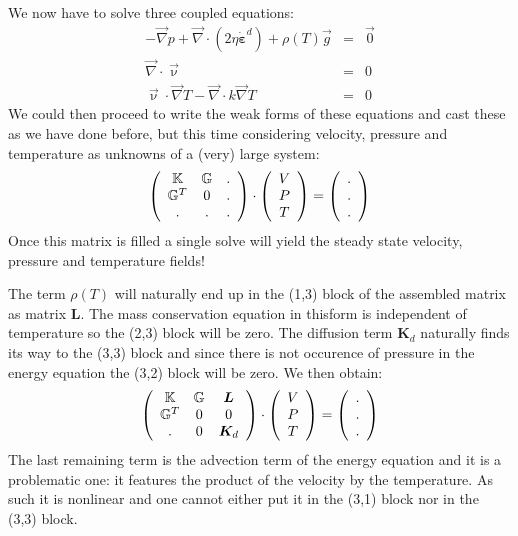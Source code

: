 We now have to solve three coupled equations:
\begin{eqnarray}
-{\vec \nabla}p + {\vec \nabla}\cdot (2 \eta \dot{\bm \varepsilon}^d ) + \rho(T) {\vec g} &=& \vec{0} \\
{\vec \nabla}\cdot{\vec \upnu} &=& 0 \\ 
\vec{\upnu}\cdot\vec\nabla T - {\vec \nabla} \cdot k {\vec \nabla} T &=& 0 
\end{eqnarray}
We could then proceed to write the weak forms of these equations and cast these as we have done before, 
but this time considering velocity, pressure and temperature as unknowns of a (very) large system:
\[
\left(
\begin{array}{ccc}
{\mathbb{K}} & {\mathbb{G}} & . \\
{\mathbb{G}}^T & 0 & . \\
. & . & . 
\end{array}
\right)
\cdot
\left(
\begin{array}{c}
V \\ P \\ T 
\end{array}
\right)
=
\left(
\begin{array}{c}
. \\ . \\ .
\end{array}
\right)
\]
Once this matrix is filled a single solve will yield the steady state velocity, pressure and 
temperature fields! 

The term $\rho(T)$ will naturally end up in the (1,3) block of the assembled matrix as matrix ${\bm L}$.
The mass conservation equation in thisform is independent of temperature so the (2,3) block 
will be zero. The diffusion term ${\bm K}_d$ naturally finds its way to the (3,3) 
block and since there is not occurence of pressure in the energy equation the (3,2) 
block will be zero. We then obtain:
\[
\left(
\begin{array}{ccc}
{\mathbb{K}} & {\mathbb{G}} & {\bm L} \\
{\mathbb{G}}^T & 0 & 0 \\
. & 0 & {\bm K}_d 
\end{array}
\right)
\cdot
\left(
\begin{array}{c}
V \\ P \\ T 
\end{array}
\right)
=
\left(
\begin{array}{c}
. \\ . \\ .
\end{array}
\right)
\]
The last remaining term is the advection term of the energy equation and it is a problematic one:
it features the product of the velocity by the temperature. As such it is nonlinear and one cannot 
either put it in the (3,1) block nor in the (3,3) block. 

